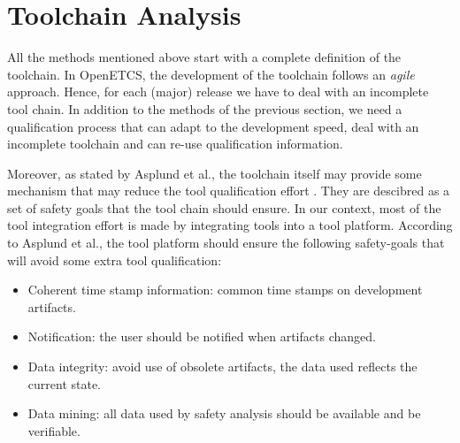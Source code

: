 \section{Toolchain Analysis}
\label{sec:toolchain-analysis}

All the methods mentioned above start with a complete definition of the toolchain. In OpenETCS, the development of the toolchain follows an \emph{agile} approach.
Hence, for each (major) release we have to deal with an incomplete tool
chain. In addition to the methods of the previous section,  we need a qualification
process that can adapt to the development speed, deal with an incomplete toolchain
and can re-use qualification information.

Moreover, as stated by Asplund et al., the toolchain itself may
provide some mechanism that may reduce the tool qualification effort
\cite{asplund_towards_2012,asplund_qualifying_2012}. They are
descibred as a set of safety goals that the tool chain should ensure.
 In our context, most of the
tool integration effort is made by integrating tools into a tool
platform.  According to Asplund et al., the tool platform should
ensure the following safety-goals that will avoid some extra tool qualification:
\begin{itemize}
\item Coherent time stamp information: common time stamps on development artifacts.
\item Notification: the user should be notified when artifacts changed.
\item Data integrity:  avoid use of obsolete artifacts, the data used reflects the
  current state.
\item Data mining: all data used by safety analysis should be available and be
  verifiable.
\end{itemize}

